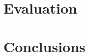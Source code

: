 \documentclass[
11pt, %
english, %
singlespacing, %
headsepline, %
]{MastersDoctoralThesis} %
\begin{document}
	\chapter{Evaluation}
	\label{sec:Evaluation}
	
	\clearpage
	\chapter{Conclusions}
	\label{sec:Conclusions}
	
	\clearpage
	



\appendix %





\printbibliography[heading=bibintoc]

\end{document}
